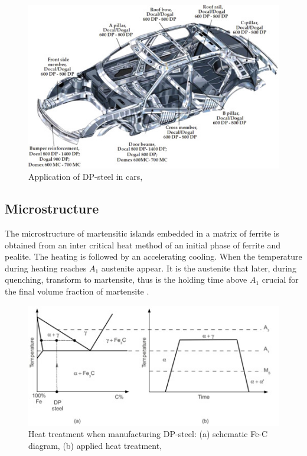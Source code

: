 \documentclass{article}
\begin{document}
\begin{figure}[h!]
    \includegraphics[width=\linewidth]{DPinCars.jpg}
    \caption{Application of DP-steel in cars, \cite{Fonstein}}
    \label{fig:DP in cars}

\end{figure}



\subsection{Microstructure}
The microstructure of martensitic islands embedded in a matrix of ferrite is obtained from an inter critical heat method of an initial phase of ferrite and pealite. The heating is followed by an accelerating cooling. When the temperature during heating reaches $A_1$ austenite appear. It is the austenite that later, during quenching, transform to martensite, thus is the holding time above $A_1$ crucial for the final volume fraction of martensite \cite{Chatterjee}.  

\begin{figure}[h!]
    \includegraphics[width=\linewidth]{DPManufacturing.jpg}
    \caption{Heat treatment when manufacturing DP-steel: (a) schematic Fe-C diagram, (b) applied heat treatment, \cite{Landron}}
    \label{fig:Manufacturing}

\end{figure}
\end{document}
